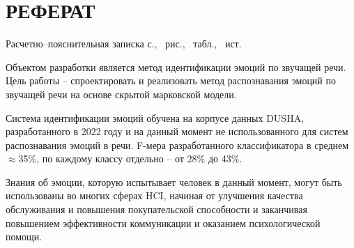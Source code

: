 \part*{РЕФЕРАТ}

Расчетно--пояснительная записка \pageref{LastPage} с., \totalfigures\ рис., \totaltables\ табл., \thetotalbibentries\ ист.

Объектом разработки является метод идентификации эмоций по звучащей речи. Цель работы -- спроектировать и реализовать метод распознавания эмоций по звучащей речи на основе скрытой марковской модели. 

Система идентификации эмоций обучена на корпусе данных DUSHA, разработанного в 2022 году и на данный момент не использованного для систем распознавания эмоций в речи. F-мера разработанного классификатора в среднем  $\approx$35\%, по каждому классу отдельно -- от 28\% до 43\%. 

Знания об эмоции, которую испытывает человек в данный момент, могут быть использованы во многих сферах HCI, начиная от улучшения качества обслуживания и повышения покупательской способности и заканчивая повышением эффективности коммуникации и оказанием психологической помощи. 
